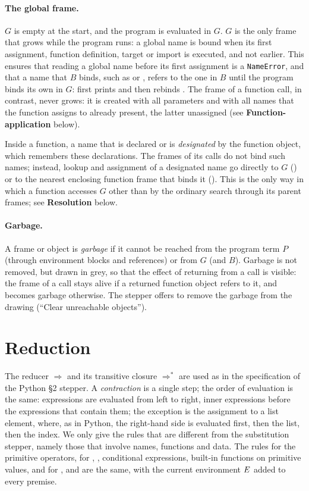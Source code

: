 \paragraph{The global frame.} $G$ is empty at the start, and the program is
evaluated in $G$. $G$ is the only frame that grows while the program runs: a
global name is bound when its first assignment, function definition, 
target or import is executed, and not earlier. This ensures that reading a global name before its first assignment is a
\texttt{NameError}, and that a name that $B$ binds, such as  or
, refers to the one in $B$ until the program binds its own in $G$:
 first prints and then rebinds . The frame of a function
call, in contrast, never grows: it is created with all parameters and with all
names that the function assigns to already present, the latter unassigned
(see \textbf{Function-application} below).

Inside a function, a name that is declared  or 
is \emph{designated} by the function object, which remembers these
declarations. The frames of its calls do not bind such names; instead, lookup and
assignment of a designated name go directly to $G$ () or to the
nearest enclosing function frame that binds it (). This is the
only way in which a function accesses $G$ other than by the ordinary search
through its parent frames; see \textbf{Resolution} below.

\paragraph{Garbage.} A frame or object is \emph{garbage} if it cannot be
reached from the program term $P$ (through environment blocks and
references) or from $G$ (and $B$). Garbage is not removed, but drawn in grey, so that
the effect of returning from a call is visible: the frame of a call stays
alive if a returned function object refers to it, and becomes garbage
otherwise. The stepper offers to remove the garbage from the drawing
(``Clear unreachable objects'').

\section*{Reduction}

The reducer $\Rightarrow$ and its transitive closure $\Rightarrow^*$ are used
as in the specification of the Python \S 2 stepper. A \emph{contraction} is a
single step; the order of evaluation is the same: expressions are evaluated
from left to right, inner expressions before the expressions that contain
them; the exception is the assignment to a list element, where, as in Python, the
right-hand side is evaluated first, then the list, then the index. We only give the rules that
are different from the substitution
stepper, namely those that involve names, functions and data. The rules for
the primitive operators, for , , conditional
expressions, built-in functions on primitive values, and for ,
 and  are the same, with the current
environment $E$ added to every premise.

